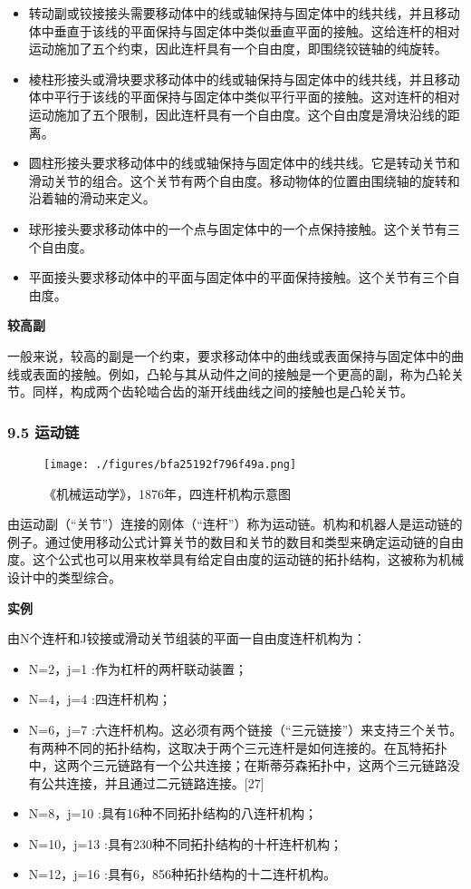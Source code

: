 \begin{itemize}
\item 转动副或铰接接头需要移动体中的线或轴保持与固定体中的线共线，并且移动体中垂直于该线的平面保持与固定体中类似垂直平面的接触。这给连杆的相对运动施加了五个约束，因此连杆具有一个自由度，即围绕铰链轴的纯旋转。
\item 棱柱形接头或滑块要求移动体中的线或轴保持与固定体中的线共线，并且移动体中平行于该线的平面保持与固定体中类似平行平面的接触。这对连杆的相对运动施加了五个限制，因此连杆具有一个自由度。这个自由度是滑块沿线的距离。
\item 圆柱形接头要求移动体中的线或轴保持与固定体中的线共线。它是转动关节和滑动关节的组合。这个关节有两个自由度。移动物体的位置由围绕轴的旋转和沿着轴的滑动来定义。
\item 球形接头要求移动体中的一个点与固定体中的一个点保持接触。这个关节有三个自由度。
\item 平面接头要求移动体中的平面与固定体中的平面保持接触。这个关节有三个自由度。
\end{itemize}


\textbf{较高副}

一般来说，较高的副是一个约束，要求移动体中的曲线或表面保持与固定体中的曲线或表面的接触。例如，凸轮与其从动件之间的接触是一个更高的副，称为凸轮关节。同样，构成两个齿轮啮合齿的渐开线曲线之间的接触也是凸轮关节。

\subsubsection{9.5 运动链}

\begin{figure}[ht]
\centering
\texttt{[image: ./figures/bfa25192f796f49a.png]}
\caption{《机械运动学》，1876年，四连杆机构示意图} \label{fig_YDX_1}
\end{figure}

由运动副（“关节”）连接的刚体（“连杆”）称为运动链。机构和机器人是运动链的例子。通过使用移动公式计算关节的数目和关节的数目和类型来确定运动链的自由度。这个公式也可以用来枚举具有给定自由度的运动链的拓扑结构，这被称为机械设计中的类型综合。

\textbf{实例}

由N个连杆和J铰接或滑动关节组装的平面一自由度连杆机构为：

\begin{itemize}
\item N=2，j=1 :作为杠杆的两杆联动装置；
\item N=4，j=4 :四连杆机构；
\item N=6，j=7 :六连杆机构。这必须有两个链接（“三元链接”）来支持三个关节。有两种不同的拓扑结构，这取决于两个三元连杆是如何连接的。在瓦特拓扑中，这两个三元链路有一个公共连接；在斯蒂芬森拓扑中，这两个三元链路没有公共连接，并且通过二元链路连接。[27]
\item N=8，j=10 :具有16种不同拓扑结构的八连杆机构；
\item N=10，j=13 :具有230种不同拓扑结构的十杆连杆机构；
\item N=12，j=16 :具有6，856种拓扑结构的十二连杆机构。
\end{itemize}

